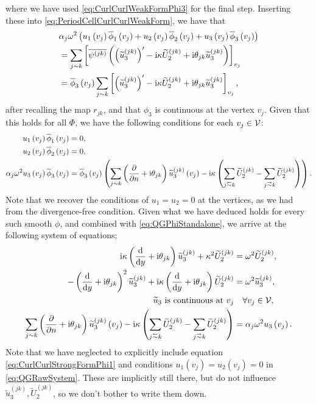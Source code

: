\documentclass[11pt]{report}
\begin{document}
where we have used \eqref{eq:CurlCurlWeakFormPhi3} for the final step.
Inserting these into \eqref{eq:PeriodCellCurlCurlWeakForm}, we have that
\begin{align*}
	& \alpha_j \omega^2 \left(  u_1\left( v_j \right) \overline{\phi}_1\left( v_j \right) + u_2\left( v_j \right) \overline{\phi}_2\left( v_j \right) + u_3\left( v_j \right) \overline{\phi}_3\left( v_j \right)  \right) \\
	&= \sum_{j\sim k}\left[  \overline{\psi^{(jk)}}\left(  \left( \widetilde{u}_3^{(jk)} \right)' - \mathrm{i}\kappa\widetilde{U}_2^{(jk)} + \mathrm{i}\theta_{jk}\widetilde{u}_3^{(jk)}  \right)  \right]_{v_j} \\
	&= \overline{\phi}_3\left( v_j \right)\sum_{j\sim k}\left[  \left( \widetilde{u}_3^{(jk)} \right)' - \mathrm{i}\kappa\widetilde{U}_2^{(jk)} + \mathrm{i}\theta_{jk}\widetilde{u}_3^{(jk)}  \right]_{v_j},
\end{align*}
after recalling the map $r_{jk}$, and that $\phi_3$ is continuous at the vertex $v_j$.
Given that this holds for all $\Phi$, we have the following conditions for each $v_j\in\mathcal{V}$: 
\begin{align*}
	u_1\bracs{v_j}\overline{\phi}_1\bracs{v_j} &= 0, \\
	u_2\bracs{v_j}\overline{\phi}_2\bracs{v_j} &= 0, \\
	\alpha_j \omega^2 u_3\bracs{v_j} \overline{\phi}_3\bracs{v_j} 
	&= \overline{\phi}_3\bracs{v_j} \bracs{ \sum_{j\con k} \bracs{ \pdiff{}{n} + \rmi\qm_{jk} }\widetilde{u}_3^{(jk)}\bracs{v_j} - \rmi\wavenumber\bracs{ \sum_{j\conRight k} \widetilde{U}_2^{(jk)} - \sum_{j\conLeft k} \widetilde{U}_2^{(jk)} } }.
\end{align*}
Note that we recover the conditions of $u_1=u_2=0$ at the vertices, as we had from the divergence-free condition.
Given what we have deduced holds for every such smooth $\phi$, and combined with \eqref{eq:QGPhiStandalone}, we arrive at the following system of equations;
\begin{subequations} \label{eq:QGRawSystem}
	\begin{align}
		\rmi\wavenumber \bracs{ \diff{}{y} + \rmi\qm_{jk} }\widetilde{u}_3^{(jk)} + \wavenumber^2\widetilde{U}_2^{(jk)} &= \omega^2\widetilde{U}_2^{(jk)}, \label{eq:QGPhi2} \\
		-\bracs{ \diff{}{y} + \rmi\qm_{jk} }^2\widetilde{u}_3^{(jk)} + \rmi\wavenumber\bracs{ \diff{}{y} + \rmi\qm_{jk} }\widetilde{U}_2^{(jk)} &= \omega^2 \widetilde{u}_3^{(jk)}, \label{eq:QGPhi3} \\
		\widetilde{u}_3 \text{ is continuous at } v_j &\quad\forall v_j\in\vertSet, \label{eq:QGContinuity} \\
		\sum_{j\con k} \bracs{ \pdiff{}{n} + \rmi\qm_{jk} }\widetilde{u}_3^{(jk)}\bracs{v_j} - \rmi\wavenumber\bracs{ \sum_{j\conRight k} \widetilde{U}_2^{(jk)} - \sum_{j\conLeft k} \widetilde{U}_2^{(jk)} } 
		&= \alpha_j \omega^2 u_3\bracs{v_j}. \label{eq:QGVertexCondition}
	\end{align}
\end{subequations}
Note that we have neglected to explicitly include equation \eqref{eq:CurlCurlStrongFormPhi1} and conditions $u_1(v_j)=u_2(v_j)=0$ in \eqref{eq:QGRawSystem}.
These are implicitly still there, but do not influence $\widetilde{u}_3^{(jk)}, \widetilde{U}_2^{(jk)}$, so we don't bother to write them down.
\end{document}
